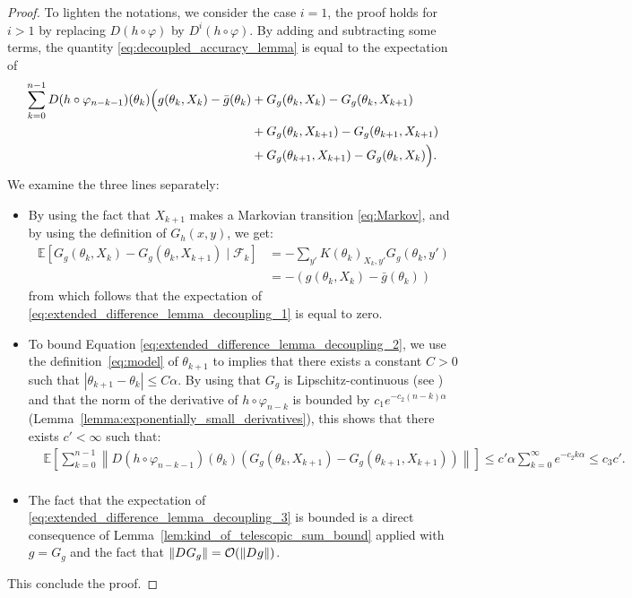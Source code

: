 \documentclass{article}
\newcommand{\calF}{\mathcal{F}}
\newcommand\E{\mathbb{E}}
\newcommand\esp[1]{\E\left[#1\right]}
\newcommand\abs[1]{\left|#1\right|}
\newcommand\norm[1]{\left\|#1\right\|}
\newcommand\bO[1]{\mathcal{O}(#1)}
\newcommand\normop[2][]{\norm{D^{\ifthenelse{\equal{#1}{}}{}{\le #1}}#2}}
\begin{document}
\begin{proof}
    To lighten the notations, we consider the case $i=1$, the proof holds for $i>1$ by replacing $D(h\circ\varphi)$ by $D^i(h\circ \varphi)$. By adding and subtracting some terms, the quantity \eqref{eq:decoupled_accuracy_lemma} is equal to the expectation of
    \begin{align}
        \sum_{k=0}^{n-1}D(h \circ \varphi_{n-k-1})(\theta_{k}) \Bigl( g(\theta_{k},X_{k})- \bar{g}(\theta_{k}) 
        &+ G_{g}(\theta_{k}, X_{k}) - G_{g}(\theta_{k}, X_{k+1}) \label{eq:extended_difference_lemma_decoupling_1}\\
        & + G_{g}(\theta_{k}, X_{k+1}) - G_{g}(\theta_{k+1}, X_{k+1}) \label{eq:extended_difference_lemma_decoupling_2}\\
        & + G_{g}(\theta_{k+1}, X_{k+1}) - G_{g}(\theta_{k}, X_{k}) \Bigr). \label{eq:extended_difference_lemma_decoupling_3}
    \end{align}
    We examine the three lines separately: 
    \begin{itemize}
        \item By using the fact that $X_{k+1}$ makes a Markovian transition \eqref{eq:Markov}, and by using the definition of $G_h(x,y)$, we get: 
        \begin{align*}
            \esp{G_{g}(\theta_k, X_k) - G_{g}(\theta_k, X_{k+1})\mid \calF_k}
            & = -\sum_{y'} K(\theta_{k})_{X_k,y'} G_{g}(\theta_k,y') \\
            & = - (g(\theta_k,X_k)-\bar{g}(\theta_{k}))
        \end{align*}
        from which follows that the expectation of \eqref{eq:extended_difference_lemma_decoupling_1} is equal to zero.
        \item     To bound Equation \eqref{eq:extended_difference_lemma_decoupling_2}, we use the definition~\eqref{eq:model} of $\theta_{k+1}$ to implies that there exists a constant $C>0$ such that $\abs{\theta_{k+1} - \theta_k} \le C\alpha $. By using that $G_g$ is Lipschitz-continuous (see \cite[Lemma~4]{allmeier2023bias}) and that the norm of the derivative of $h\circ\varphi_{n-k}$ is bounded by $c_1e^{-c_2(n-k)\alpha}$ (Lemma~\ref{lemma:exponentially_small_derivatives}), this shows that there exists $c'<\infty$ such that:
        \begin{align*}
            & \esp{\sum_{k=0}^{n-1}\norm{D(h \circ \varphi_{n-k-1})(\theta_{k}) \left( G_{g}(\theta_{k}, X_{k+1}) - G_{g}(\theta_{k+1}, X_{k+1}) \right) }} \le c' \alpha \sum_{k=0}^\infty e^{-c_2k\alpha} \le c_3c'. \\
        \end{align*}
        \item     The fact that the expectation of \eqref{eq:extended_difference_lemma_decoupling_3} is bounded is a direct consequence of Lemma~\ref{lem:kind_of_telescopic_sum_bound} applied with $g=G_g$ and the fact that $\normop{G_g}=\bO{\normop{g}}$.
    \end{itemize}
    This conclude the proof.
\end{proof}
\end{document}
